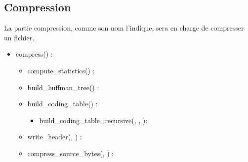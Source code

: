 \subsection{Compression}

La partie compression, comme son nom l'indique, sera en charge de compresser un fichier.

\begin{itemize}
    \item compress(\binaryFile) : \binaryFile
    \begin{itemize}
        \item compute\_statistics(\binaryFile) : \statistics
        \item build\_huffman\_tree(\statistics) : \huffmanTree
        \item build\_coding\_table(\huffmanTree) : \codingTable
        \begin{itemize}
            \item build\_coding\_table\_recursive(\huffmanTree, \codingTable, \binaryCode): \codingTable
        \end{itemize}
        \item write\_header(\binaryFile, \codingTable) : \binaryFile
        \item compress\_source\_bytes(\binaryFile, \codingTable) : \binaryFile
    \end{itemize}
\end{itemize}
